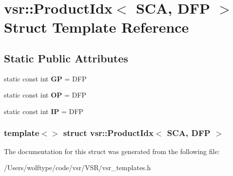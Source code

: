 \hypertarget{structvsr_1_1_product_idx_3_01_s_c_a_00_01_d_f_p_01_4}{\section{vsr\-:\-:Product\-Idx$<$ S\-C\-A, D\-F\-P $>$ Struct Template Reference}
\label{structvsr_1_1_product_idx_3_01_s_c_a_00_01_d_f_p_01_4}
}
\subsection*{Static Public Attributes}
\begin{DoxyCompactItemize}
\item 
\hypertarget{structvsr_1_1_product_idx_3_01_s_c_a_00_01_d_f_p_01_4_a99cd51b2138b9806e4ba64ff048a8ea6}{static const int {\bfseries G\-P} = D\-F\-P}\label{structvsr_1_1_product_idx_3_01_s_c_a_00_01_d_f_p_01_4_a99cd51b2138b9806e4ba64ff048a8ea6}

\item 
\hypertarget{structvsr_1_1_product_idx_3_01_s_c_a_00_01_d_f_p_01_4_a60346b013e3185036d7895696129f938}{static const int {\bfseries O\-P} = D\-F\-P}\label{structvsr_1_1_product_idx_3_01_s_c_a_00_01_d_f_p_01_4_a60346b013e3185036d7895696129f938}

\item 
\hypertarget{structvsr_1_1_product_idx_3_01_s_c_a_00_01_d_f_p_01_4_affad5b2da322940e93660e8fb6480f8e}{static const int {\bfseries I\-P} = D\-F\-P}\label{structvsr_1_1_product_idx_3_01_s_c_a_00_01_d_f_p_01_4_affad5b2da322940e93660e8fb6480f8e}

\end{DoxyCompactItemize}
\subsubsection*{template$<$$>$ struct vsr\-::\-Product\-Idx$<$ S\-C\-A, D\-F\-P $>$}



The documentation for this struct was generated from the following file\-:\begin{DoxyCompactItemize}
\item 
/\-Users/wolftype/code/vsr/\-V\-S\-R/vsr\-\_\-templates.\-h\end{DoxyCompactItemize}

